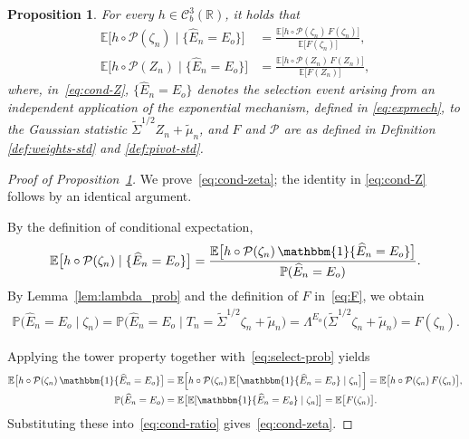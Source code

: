 \documentclass[12pt]{article}
\newtheorem{proposition}{Proposition}[section]
\newcommand{\one}{\mathbbm{1}}
\newcommand{\real}{\mathbb{R}}
\newcommand{\Pp}{{\mathbb{P}}}
\newcommand{\Ee}{{\mathbb{E}}}
\newcommand{\cP}{{\mathcal{P}}}
\newcommand{\Ehat}{\widehat{E}}
\begin{document}
\begin{appendices}
\begin{proposition}
\label{prop:condexpectation}
For every $h\in\mathcal C^3_b(\real)$, it holds that
\begin{align}
  \label{eq:cond-zeta}
  \Ee\big[h\circ\cP(\zeta_n)\mid\{\Ehat_n=E_o\}\big]
  &=\frac{\Ee\big[h\circ\cP(\zeta_n)\,F(\zeta_n)\big]}
         {\Ee\big[F(\zeta_n)\big]},\\
  \label{eq:cond-Z}
  \Ee\big[h\circ\cP(Z_n)\mid\{\Ehat_n=E_o\}\big]
  &=\frac{\Ee\big[h\circ\cP(Z_n)\,F(Z_n)\big]}
         {\Ee\big[F(Z_n)\big]},
\end{align}
where, in~\eqref{eq:cond-Z}, $\{\Ehat_n=E_o\}$ denotes the selection event arising from an independent application of the exponential mechanism, defined in \eqref{eq:expmech}, to the Gaussian statistic $\widetilde\Sigma^{1/2}Z_n+\widetilde\mu_n$, and $F$ and $\cP$ are as defined in Definition \ref{def:weights-std} and \ref{def:pivot-std}. 
\end{proposition}


\begin{proof}[Proof of Proposition~\ref{prop:condexpectation}]
We prove~\eqref{eq:cond-zeta}; the identity in \eqref{eq:cond-Z} follows by
an identical argument.

By the definition of conditional expectation,
\begin{align}
  \label{eq:cond-ratio}
  \Ee\big[h\circ\cP(\zeta_n)\mid\{\Ehat_n=E_o\}\big]
  =\dfrac{\Ee\big[h\circ\cP(\zeta_n)\,\one\{\Ehat_n=E_o\}\big]}{\Pp(\Ehat_n=E_o)}.
\end{align}
By Lemma~\ref{lem:lambda_prob} and the definition of $F$ in~\eqref{eq:F}, we obtain
\begin{align}
  \label{eq:select-prob}
  \Pp\big(\Ehat_n=E_o\mid\zeta_n\big)
  =\Pp\big(\Ehat_n=E_o\mid T_n=\widetilde\Sigma^{1/2}\zeta_n
     +\widetilde\mu_n\big)
  =\Lambda^{E_o}\big(\widetilde\Sigma^{1/2}\zeta_n+\widetilde\mu_n\big)
  =F(\zeta_n).
\end{align}

Applying the tower property together with~\eqref{eq:select-prob} yields
\begin{align*}
  \Ee\big[h\circ\cP(\zeta_n)\,\one\{\Ehat_n=E_o\}\big]
  &=\Ee\Big[h\circ\cP(\zeta_n)\,
      \Ee\big[\one\{\Ehat_n=E_o\}\mid\zeta_n\big]\Big]
   =\Ee\big[h\circ\cP(\zeta_n)\,F(\zeta_n)\big],\\
  \Pp(\Ehat_n=E_o)
  &=\Ee\big[\Ee[\one\{\Ehat_n=E_o\}\mid\zeta_n]\big]
   =\Ee\big[F(\zeta_n)\big].
\end{align*}
Substituting these into~\eqref{eq:cond-ratio} gives~\eqref{eq:cond-zeta}.
\end{proof}



\end{appendices}
\end{document}
